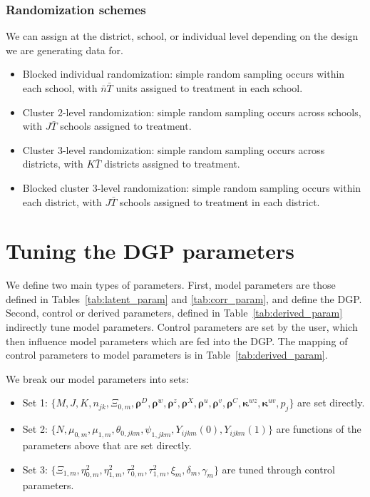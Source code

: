 \documentclass[12pt]{article}
\newcommand\mb[1]{\boldsymbol{#1}}
\begin{document}
\subsubsection{Randomization schemes}

We can assign at the district, school, or individual level depending on the design we are generating data for.

\begin{itemize}
\item Blocked individual randomization: simple random sampling occurs within each school, with $\bar{n}\bar{T}$ units assigned to treatment in each school.
\item Cluster 2-level randomization: simple random sampling occurs across schools, with $J \bar{T}$ schools assigned to treatment.
\item Cluster 3-level randomization: simple random sampling occurs across districts, with $K \bar{T}$ districts assigned to treatment.
\item Blocked cluster 3-level randomization: simple random sampling occurs within each district, with $J\bar{T}$ schools assigned to treatment in each district.
\end{itemize}


\section{Tuning the DGP parameters}
\label{sec:tune}

We define two main types of parameters.
First, model parameters are those defined in Tables~\ref{tab:latent_param} and \ref{tab:corr_param}, and define the DGP.
Second, control or derived parameters, defined in Table~\ref{tab:derived_param} indirectly tune model parameters.
Control parameters are set by the user, which then influence model parameters which are fed into the DGP.
The mapping of control parameters to model parameters is in Table~\ref{tab:derived_param}.

We break our model parameters into sets:
\begin{itemize}
\item Set 1: $\{M, J, K, n_{jk}, \Xi_{0,m}, \mb{\rho}^D, \mb{\rho}^w, \mb{\rho}^z, \mb{\rho}^X, \mb{\rho}^u, \mb{\rho}^v, \mb{\rho}^C, \boldsymbol{\kappa}^{wz}, \boldsymbol{\kappa}^{uv}, p_j\}$ are set directly.
\item Set 2: $\{N, \mu_{0,m}, \mu_{1,m}, \theta_{0,jkm}, \psi_{1,jkm}, Y_{ijkm}(0), Y_{ijkm}(1) \}$ are functions of the parameters above that are set directly.
\item Set 3: $\{\Xi_{1,m}, \eta^2_{0,m}, \eta^2_{1,m}, \tau^2_{0,m}, \tau^2_{1,m}, \xi_m, \delta_m, \gamma_m\}$ are tuned through control parameters.
\end{itemize}
\end{document}
